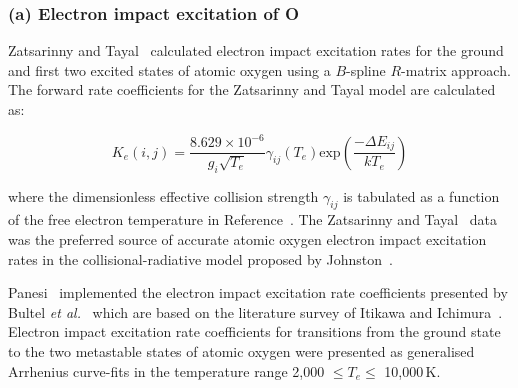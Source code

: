 {\subsubsection{(a) Electron impact excitation of O}

Zatsarinny and Tayal~\cite{ZT2003} calculated electron impact excitation rates for the ground and first two excited states of atomic oxygen using a $B$-spline $R$-matrix approach.
The forward rate coefficients for the Zatsarinny and Tayal model are calculated as:

\begin{equation}
K_e(i,j) = \frac{8.629 \times 10^{-6}}{g_i \sqrt{T_e}} \gamma_{ij}(T_e) \text{exp} \left ( \frac{-\Delta E_{ij}}{k T_e} \right ) %
\end{equation}

\noindent where the dimensionless effective collision strength $\gamma_{ij}$ is tabulated as a function of the free electron temperature in Reference~\cite{ZT2003}.
The Zatsarinny and Tayal~\cite{ZT2003} data was the preferred source of accurate atomic oxygen electron impact excitation rates in the collisional-radiative model proposed by Johnston~\cite{JohnPhd}.

\par

Panesi~\cite{panesi_phd} implemented the electron impact excitation rate coefficients presented by Bultel \textit{et al.}~\cite{BBB+2006} which are based on the literature survey of Itikawa and Ichimura~\cite{II1990}.
Electron impact excitation rate coefficients for transitions from the ground state to the two metastable states of atomic oxygen were presented as generalised Arrhenius curve-fits in the temperature range 2,000 $\leq T_e \leq$ 10,000\,K.

\par

}
